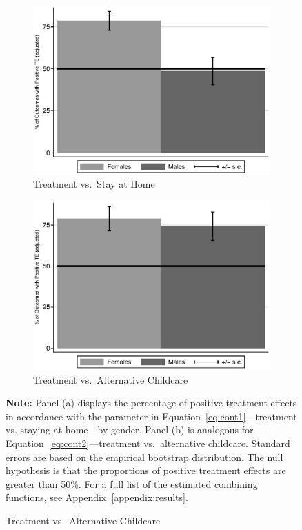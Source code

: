 \begin{figure}[!htbp]
\centering
\caption{Positively Impacted Outcomes, ABC/CARE Males and Females}\label{fig:ppositive}
\begin{subfigure}[h]{0.5\textwidth}
		\centering
		\caption{ Treatment vs.\ Stay at Home} \label{fig:ppositivehome}
		\includegraphics[width=\textwidth]{output/epan_ipw_p0_all.eps}
\end{subfigure}%
\begin{subfigure}[h]{0.5\textwidth}
	\centering
	\caption{Treatment vs.\ Alternative Childcare} \label{fig:ppositivealternative}
		\includegraphics[width=\textwidth]{output/epan_ipw_p1_all.eps}
\end{subfigure}
\footnotesize \justify
\textbf{Note:} Panel (a) displays the percentage of positive treatment effects in accordance with the parameter in Equation~\eqref{eq:cont1}---treatment vs. staying at home---by gender. Panel (b) is analogous for Equation~\eqref{eq:cont2}---treatment vs.\ alternative childcare. Standard errors are based on the empirical bootstrap distribution. The null hypothesis is that the proportions of positive treatment effects are greater than 50\%. For a full list of the estimated combining functions, see Appendix~\ref{appendix:results}. \\
\end{figure}

